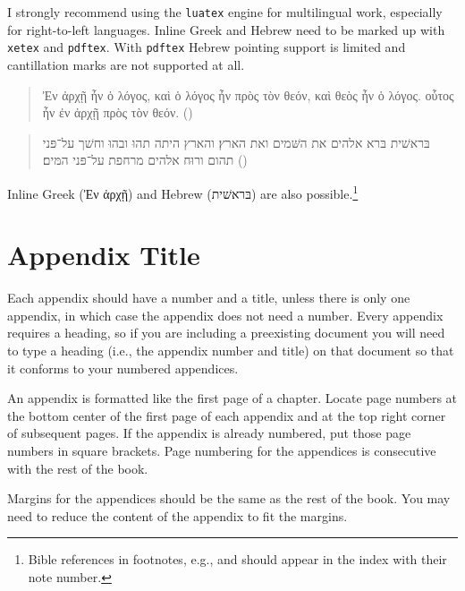 \documentclass[sblidx={ancient sources, modern authors, subject}]{sblbook}
\begin{document}
I strongly recommend using the \texttt{luatex} engine for multilingual work,
especially for right-to-left languages. Inline Greek and Hebrew need to be
marked up with \texttt{xetex} and \texttt{pdftex}. With \texttt{pdftex} Hebrew
pointing support is limited and cantillation marks are not supported at all.
\begin{quotation}
  Ἐν ἀρχῇ ἦν ὁ λόγος, καὶ ὁ λόγος ἦν πρὸς τὸν θεόν, καὶ θεὸς ἦν ὁ λόγος.
  οὗτος ἦν ἐν ἀρχῇ πρὸς τὸν θεόν.
  \foreignlanguage{american}{()}
\end{quotation}
\begin{quotation}
  בּראשׁית בּרא אלהים את השּׁמים ואת הארץ׃ והארץ היתה תהוּ ובהוּ וחשׁך על־פּני תהום
  ורוּח אלהים מרחפת על־פּני המּים׃
  \foreignlanguage{american}{()}
\end{quotation}
Inline Greek (\foreignlanguage{polytonicgreek}{Ἐν ἀρχῇ}) and Hebrew
(\foreignlanguage{hebrew}{בּראשׁית}) are also possible.\footnote{Bible
references in footnotes, e.g.,  and
 should appear in the index with their note
number.}

\appendix

\chapter{Appendix Title}

%
Each appendix should have a number and a title, unless there is only one
appendix, in which case the appendix does not need a number. Every appendix
requires a heading, so if you are including a preexisting document you will
need to type a heading (i.e., the appendix number and title) on that document
so that it conforms to your numbered appendices.

An appendix is formatted like the first page of a chapter. Locate page numbers
at the bottom center of the first page of each appendix and at the top right
corner of subsequent pages. If the appendix is already numbered, put those
page numbers in square brackets. Page numbering for the appendices is
consecutive with the rest of the book.

Margins for the appendices should be the same as the rest of the book. You
may need to reduce the content of the appendix to fit the margins.

\backmatter

\nocite{NIDNTT, Jastrow, DMBI, mclay:2006, oday:intertextuality, vonrad:1990}

\printbibliography[heading=bibintoc]



\SBLPrintIndices
\end{document}
